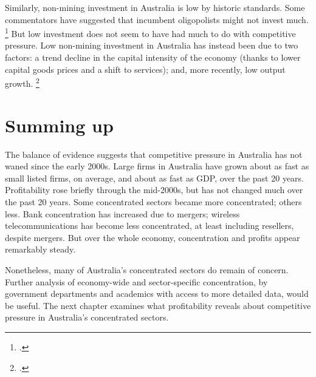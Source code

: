 Similarly, non-mining investment in Australia is low by historic standards. Some commentators have suggested that incumbent oligopolists might not invest much.%
    \footcite{Econ_probprofits2016} 
But low investment does not seem to have had much to do with competitive pressure. Low non-mining investment in Australia has instead been due to two factors: a trend decline in the capital intensity of the economy (thanks to lower capital goods prices and a shift to services); and, more recently, low output growth.%
    \footcite{MinifieChisholmPercival2017} 

\section{Summing up}

The balance of evidence suggests that competitive pressure in Australia has not waned since the early 2000s. Large firms in Australia have grown about as fast as small listed firms, on average, and about as fast as GDP, over the past 20 years. Profitability rose briefly through the mid-2000s, but has not changed much over the past 20 years. Some concentrated sectors became more concentrated; others less. Bank concentration has increased due to mergers; wireless telecommunications has become less concentrated, at least including resellers, despite mergers. But over the whole economy, concentration and profits appear remarkably steady.

Nonetheless, many of Australia's concentrated sectors do remain of concern. Further analysis of economy-wide and sector-specific concentration, by government departments and academics with access to more detailed data, would be useful. The next chapter examines what profitability reveals about competitive pressure in Australia's concentrated sectors.




